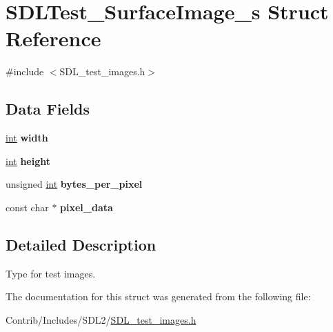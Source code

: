 \hypertarget{struct_s_d_l_test___surface_image__s}{}\section{S\+D\+L\+Test\+\_\+\+Surface\+Image\+\_\+s Struct Reference}
\label{struct_s_d_l_test___surface_image__s}


{\ttfamily \#include $<$S\+D\+L\+\_\+test\+\_\+images.\+h$>$}

\subsection*{Data Fields}
\begin{DoxyCompactItemize}
\item 
\hyperlink{_s_d_l__thread_8h_a6a64f9be4433e4de6e2f2f548cf3c08e}{int} {\bfseries width}\hypertarget{struct_s_d_l_test___surface_image__s_a2474a5474cbff19523a51eb1de01cda4}{}\label{struct_s_d_l_test___surface_image__s_a2474a5474cbff19523a51eb1de01cda4}

\item 
\hyperlink{_s_d_l__thread_8h_a6a64f9be4433e4de6e2f2f548cf3c08e}{int} {\bfseries height}\hypertarget{struct_s_d_l_test___surface_image__s_ad12fc34ce789bce6c8a05d8a17138534}{}\label{struct_s_d_l_test___surface_image__s_ad12fc34ce789bce6c8a05d8a17138534}

\item 
unsigned \hyperlink{_s_d_l__thread_8h_a6a64f9be4433e4de6e2f2f548cf3c08e}{int} {\bfseries bytes\+\_\+per\+\_\+pixel}\hypertarget{struct_s_d_l_test___surface_image__s_a6682c6bd965e44d2880453dd6ea872ce}{}\label{struct_s_d_l_test___surface_image__s_a6682c6bd965e44d2880453dd6ea872ce}

\item 
const char $\ast$ {\bfseries pixel\+\_\+data}\hypertarget{struct_s_d_l_test___surface_image__s_a8bae0b5192c70dd8e756a935caa62467}{}\label{struct_s_d_l_test___surface_image__s_a8bae0b5192c70dd8e756a935caa62467}

\end{DoxyCompactItemize}


\subsection{Detailed Description}
Type for test images. 

The documentation for this struct was generated from the following file\+:\begin{DoxyCompactItemize}
\item 
Contrib/\+Includes/\+S\+D\+L2/\hyperlink{_s_d_l__test__images_8h}{S\+D\+L\+\_\+test\+\_\+images.\+h}\end{DoxyCompactItemize}
